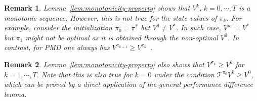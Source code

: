 \documentclass[10pt]{article}
\newcommand{\calT}{\mathcal{T}}
\theoremstyle{plain}
\newtheorem{corollary}[theorem]{Corollary}
\newtheorem{remark}{Remark}[section]
\theoremstyle{definition}
\begin{document}
\begin{remark}
Lemma~\ref{lem:monotonicity-property} shows that $V^k,\, k = 0,\cdots, T$ is a monotonic sequence. However, this is not true for the state values of $\pi_k$. For example, consider  the initialization  $\pi_0 = \pi^*$ but $V^0 \neq V^*$. In such case, $V^{\pi_0} = V^*$ but ${\pi_1}$ might not be optimal as it is obtained through the non-optimal $V^0$.
    In contrast, for PMD one always has $V^{\pi_{k+1}} \geq V^{\pi_k}$~\textup{\cite{Xiao_2022,Lan_2021}}. 
    \label{rem:monotnicity}
\end{remark}

\begin{remark}
    Lemma~\ref{lem:monotonicity-property} also shows that $V^{\pi_k}\geq V^k$ for $k=1,\cdots, T$. Note that this is also true for $k=0$ under the condition $\mathcal{T}^{\pi_0}V^0\geq V^0$, which can be proved by a direct application of the general performance difference lemma.
\end{remark}
\end{document}
